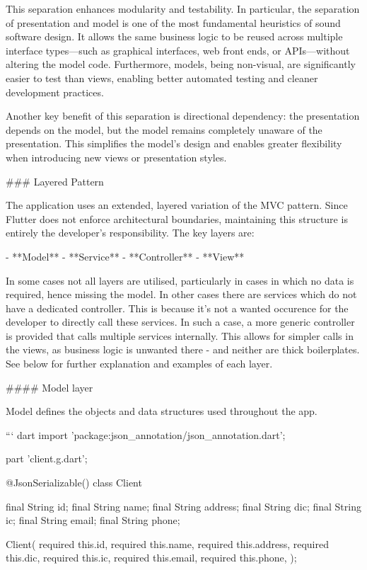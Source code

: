 \documentclass[
  digital,     %
  oneside,     %
  nosansbold,  %
  nocolorbold, %
  lof,         %
  lot,         %
]{fithesis4}
\begin{document}
\begin{markdown}
This separation enhances modularity and testability. In particular, the separation of presentation and model is one of the most fundamental heuristics of sound software design. It allows the same business logic to be reused across multiple interface types—such as graphical interfaces, web front ends, or APIs—without altering the model code. Furthermore, models, being non-visual, are significantly easier to test than views, enabling better automated testing and cleaner development practices.

Another key benefit of this separation is directional dependency: the presentation depends on the model, but the model remains completely unaware of the presentation. This simplifies the model’s design and enables greater flexibility when introducing new views or presentation styles.

### Layered Pattern

The application uses an extended, layered variation of the MVC pattern. Since Flutter does not enforce architectural boundaries, maintaining this structure is entirely the developer's responsibility. The key layers are:

- **Model**
- **Service**
- **Controller**
- **View**

In some cases not all layers are utilised, particularly in cases in which no data is required, hence missing the model. In other cases there are services which do not have a dedicated controller. This is because it's not a wanted occurence for the developer to directly call these services. In such a case, a more generic controller is provided that calls multiple services internally. This allows for simpler calls in the views, as business logic is unwanted there - and neither are thick boilerplates. See below for further explanation and examples of each layer.

#### Model layer

Model defines the objects and data structures used throughout the app.

``` dart
import 'package:json_annotation/json_annotation.dart';

part 'client.g.dart';

@JsonSerializable()
class Client {
  final String id;
  final String name;
  final String address;
  final String dic;
  final String ic;
  final String email;
  final String phone;

  Client({
    required this.id,
    required this.name,
    required this.address,
    required this.dic,
    required this.ic,
    required this.email,
    required this.phone,
  });

}
\end{markdown}
\end{document}
